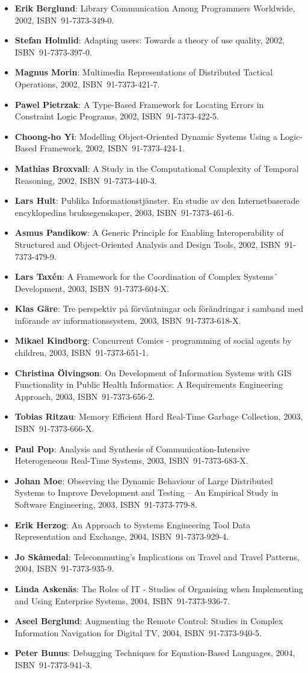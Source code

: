 \documentclass[a4paper,showtrims,twocolumn]{memoir}
\newenvironment{theses}{
  \begin{itemize}
    \setlength{\itemsep}{0.2em}
    \setlength{\parskip}{0em}
    \setlength{\parsep}{0em}
}{
  \end{itemize}
}
\newcommand{\thesis}[5]{\item[No.~#1] \textbf{#2}: #3, #4, ISBN~#5.}
\begin{document}
\begin{theses}
    \thesis{758}{Erik Berglund}{Library Communication Among Programmers Worldwide}{2002}{91-7373-349-0}
    \thesis{765}{Stefan Holmlid}{Adapting users: Towards a theory of use quality}{2002}{91-7373-397-0}
    \thesis{771}{Magnus Morin}{Multimedia Representations of Distributed Tactical Operations}{2002}{91-7373-421-7}
    \thesis{772}{Pawel Pietrzak}{A Type-Based Framework for Locating Errors in Constraint Logic Programs}{2002}{91-7373-422-5}
    \thesis{774}{Choong-ho Yi}{Modelling Object-Oriented Dynamic Systems Using a Logic-Based Framework}{2002}{91-7373-424-1}
    \thesis{779}{Mathias Broxvall}{A Study in the Computational Complexity of Temporal Reasoning}{2002}{91-7373-440-3}
    \thesis{785}{Lars Hult}{Publika Informationstjänster. En studie av den Internetbaserade encyklopedins bruksegenskaper}{2003}{91-7373-461-6}
    \thesis{793}{Asmus Pandikow}{A Generic Principle for Enabling Interoperability of Structured and Object-Oriented Analysis and Design Tools}{2002}{91-7373-479-9}
    \thesis{800}{Lars Taxén}{A Framework for the Coordination of Complex Systems´ Development}{2003}{91-7373-604-X}
    \thesis{808}{Klas Gäre}{Tre perspektiv på förväntningar och förändringar i samband med införande av informationssystem}{2003}{91-7373-618-X}
    \thesis{821}{Mikael Kindborg}{Concurrent Comics - programming of social agents by children}{2003}{91-7373-651-1}
    \thesis{823}{Christina Ölvingson}{On Development of Information Systems with GIS Functionality in Public Health Informatics: A Requirements Engineering Approach}{2003}{91-7373-656-2}
    \thesis{828}{Tobias Ritzau}{Memory Efficient Hard Real-Time Garbage Collection}{2003}{91-7373-666-X}
    \thesis{833}{Paul Pop}{Analysis and Synthesis of Communication-Intensive Heterogeneous Real-Time Systems}{2003}{91-7373-683-X}
    \thesis{852}{Johan Moe}{Observing the Dynamic Behaviour of Large Distributed Systems to Improve Development and Testing – An Empirical Study in Software Engineering}{2003}{91-7373-779-8}
    \thesis{867}{Erik Herzog}{An Approach to Systems Engineering Tool Data Representation and Exchange}{2004}{91-7373-929-4}
    \thesis{869}{Jo Skåmedal}{Telecommuting’s Implications on Travel and Travel Patterns}{2004}{91-7373-935-9}
    \thesis{870}{Linda Askenäs}{The Roles of IT - Studies of Organising when Implementing and Using Enterprise Systems}{2004}{91-7373-936-7}
    \thesis{872}{Aseel Berglund}{Augmenting the Remote Control: Studies in Complex Information Navigation for Digital TV}{2004}{91-7373-940-5}
    \thesis{873}{Peter Bunus}{Debugging Techniques for Equation-Based Languages}{2004}{91-7373-941-3}

\end{theses}
\end{document}
